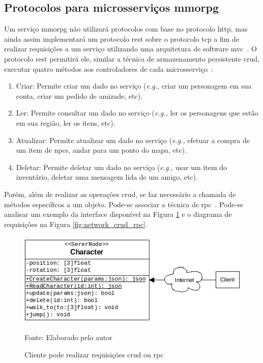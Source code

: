 \subsection{Protocolos para microsserviços \ac{mmorpg}}



Um serviço \ac{mmorpg} não utilizará protocolos com base no protocolo \ac{http}, mas ainda assim implementará um protocolo \ac{rest} sobre o protocolo \ac{tcp} a fim de realizar requisições a um serviço utilizando uma arquitetura de software \ac{mvc}~\cite{Chadwick2012Oct, LeckyThompson2008Nov}.
%
O protocolo \ac{rest} permitirá ele, similar a técnica de armazenamento persistente \ac{crud}, executar quatro métodos aos controladores de cada microsserviço~\cite{6267019}:



\begin{enumerate}
  \item Criar: Permite criar um dado no serviço (\textit{e.g.,} criar um personagem em sua conta, criar um pedido de amizade, etc).
  \item Ler: Permite consultar um dado no serviço (\textit{e.g.,} ler os personagens que estão em sua região, ler os itens, etc).
  \item Atualizar: Permite atualizar um dado no serviço (\textit{e.g.,} efetuar a compra de um item de \ac{npcs}, andar para um ponto do mapa, etc).
  \item Deletar: Permite deletar um dado no serviço (\textit{e.g.,} usar um item do inventário, deletar uma mensagem lida de um amigo, etc).
\end{enumerate}



Porém, além de realizar as operações \ac{crud}, se faz necessário a chamada de métodos específicos a um objeto.
%
Pode-se associar a técnica de \ac{rpc}~\cite{LeckyThompson2008Nov}. Pode-se analisar um exemplo da interface disponível na Figura \ref{fig:crud_rpc} e o diagrama de requisições na Figura \ref{fig:network_crud_rpc}.



\begin{figure}[htb!]
\caption{Cliente pode realizar requisições \ac{crud} ou \ac{rpc}}
\label{fig:crud_rpc}
\includegraphics[height=4.5cm]{img/cap2/crud_rpc.png}
\centering

Fonte: Elaborado pelo autor
\end{figure}



